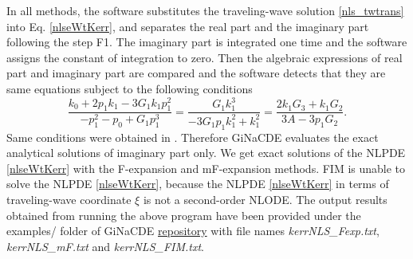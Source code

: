 \documentclass[prd,aps,floats,showkeys,nofootinbib,notitlepage]{revtex4}
\begin{document}
	
	In all methods, the software substitutes the traveling-wave solution \eqref{nls_twtrans} into Eq. \eqref{nlseWtKerr}, and separates the real part and the imaginary part following the step F1. The imaginary part is integrated one time and the software assigns the constant of integration to zero. Then the algebraic expressions of real part and imaginary part are compared and the software detects that they are same equations subject to the following conditions
	\begin{equation}\label{nlseWtKerrCond}
		\frac{{{k_0} + 2{p_1}{k_1} - 3{G_1}{k_1}p_1^2}}{{ - p_1^2 - {p_0} + {G_1}p_1^3}} = \frac{{{G_1}k_1^3}}{{ - 3{G_1}{p_1}k_1^2 + k_1^2}} = \frac{{2{k_1}{G_3} + {k_1}{G_2}}}{{3A - 3{p_1}{G_2}}}.
	\end{equation}
	Same conditions were obtained in \cite{complexTwt1}. Therefore GiNaCDE evaluates the exact analytical solutions of imaginary part only. 
	We get exact solutions of the NLPDE \eqref{nlseWtKerr} with the F-expansion and mF-expansion methods. FIM is unable to solve the NLPDE \eqref{nlseWtKerr}, because the NLPDE \eqref{nlseWtKerr} in terms of traveling-wave coordinate $\xi$ is not a second-order NLODE. The output results obtained from running the above program have been provided under the examples/ folder of GiNaCDE \href{https://github.com/mithun218/GiNaCDE}{repository} with file names \textit{kerrNLS\_Fexp.txt}, \textit{kerrNLS\_mF.txt} and \textit{kerrNLS\_FIM.txt}.  
	
	
\end{document}
